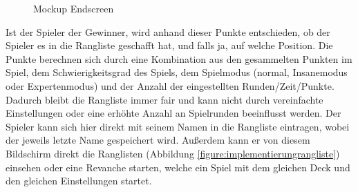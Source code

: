 \begin{figure}[h]
\begin{minipage}{0.49\textwidth}
        \caption{Mockup Endscreen}
    \end{minipage}
\end{figure}

Ist der Spieler der Gewinner, wird anhand dieser Punkte entschieden, ob der Spieler es in die Rangliste geschafft hat, und falls ja, auf welche Position. Die Punkte berechnen sich durch eine Kombination aus den gesammelten Punkten im Spiel, dem Schwierigkeitsgrad des Spiels, dem Spielmodus (normal, Insanemodus oder Expertenmodus) und der Anzahl der eingestellten Runden/Zeit/Punkte. Dadurch bleibt die Rangliste immer fair und kann nicht durch vereinfachte Einstellungen oder eine erhöhte Anzahl an Spielrunden beeinflusst werden. Der Spieler kann sich hier direkt mit seinem Namen in die Rangliste eintragen, wobei der jeweils letzte Name gespeichert wird. Außerdem kann er von diesem Bildschirm direkt die Ranglisten (Abbildung \ref{figure:implementierungrangliste}) einsehen oder eine Revanche starten, welche ein Spiel mit dem gleichen Deck und den gleichen Einstellungen startet.\\

